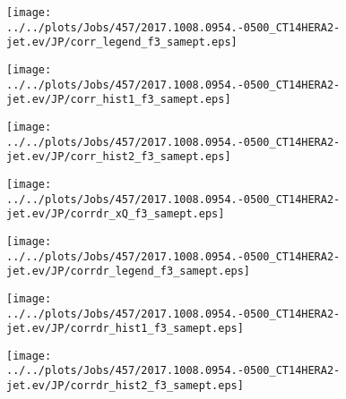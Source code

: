\documentclass[12pt]{article}
\begin{document}
\begin{figure}
\texttt{[image: ../../plots/Jobs/457/2017.1008.0954.-0500\_CT14HERA2-jet.ev/JP/corr\_legend\_f3\_samept.eps]}
\caption{}
\end{figure}\newpage\clearpage
\begin{figure}
\texttt{[image: ../../plots/Jobs/457/2017.1008.0954.-0500\_CT14HERA2-jet.ev/JP/corr\_hist1\_f3\_samept.eps]}
\caption{}
\end{figure}\newpage\clearpage
\begin{figure}
\texttt{[image: ../../plots/Jobs/457/2017.1008.0954.-0500\_CT14HERA2-jet.ev/JP/corr\_hist2\_f3\_samept.eps]}
\caption{}
\end{figure}\newpage\clearpage
\begin{figure}
\texttt{[image: ../../plots/Jobs/457/2017.1008.0954.-0500\_CT14HERA2-jet.ev/JP/corrdr\_xQ\_f3\_samept.eps]}
\caption{}
\end{figure}\newpage\clearpage
\begin{figure}
\texttt{[image: ../../plots/Jobs/457/2017.1008.0954.-0500\_CT14HERA2-jet.ev/JP/corrdr\_legend\_f3\_samept.eps]}
\caption{}
\end{figure}\newpage\clearpage
\begin{figure}
\texttt{[image: ../../plots/Jobs/457/2017.1008.0954.-0500\_CT14HERA2-jet.ev/JP/corrdr\_hist1\_f3\_samept.eps]}
\caption{}
\end{figure}\newpage\clearpage
\begin{figure}
\texttt{[image: ../../plots/Jobs/457/2017.1008.0954.-0500\_CT14HERA2-jet.ev/JP/corrdr\_hist2\_f3\_samept.eps]}
\caption{}
\end{figure}\newpage\clearpage
\end{document}
